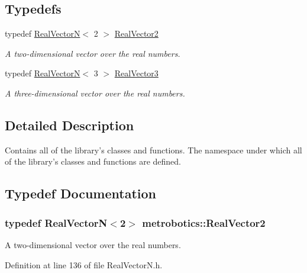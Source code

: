 \subsection*{\-Typedefs}
\begin{DoxyCompactItemize}
\item 
typedef \hyperlink{classmetrobotics_1_1RealVectorN}{\-Real\-Vector\-N}$<$ 2 $>$ \hyperlink{namespacemetrobotics_ad4763dfe0a9a900593afaaa3988068d5}{\-Real\-Vector2}
\begin{DoxyCompactList}\small\item\em \-A two-\/dimensional vector over the real numbers. \end{DoxyCompactList}\item 
typedef \hyperlink{classmetrobotics_1_1RealVectorN}{\-Real\-Vector\-N}$<$ 3 $>$ \hyperlink{namespacemetrobotics_ae3d5d1be736febeba32fbed64b429007}{\-Real\-Vector3}
\begin{DoxyCompactList}\small\item\em \-A three-\/dimensional vector over the real numbers. \end{DoxyCompactList}\end{DoxyCompactItemize}


\subsection{\-Detailed \-Description}
\-Contains all of the library's classes and functions. \-The namespace under which all of the library's classes and functions are defined. 

\subsection{\-Typedef \-Documentation}
\hypertarget{namespacemetrobotics_ad4763dfe0a9a900593afaaa3988068d5}{
\subsubsection[{\-Real\-Vector2}]{\setlength{\rightskip}{0pt plus 5cm}typedef {\bf \-Real\-Vector\-N}$<$2$>$ {\bf metrobotics\-::\-Real\-Vector2}}}\label{namespacemetrobotics_ad4763dfe0a9a900593afaaa3988068d5}


\-A two-\/dimensional vector over the real numbers. 



\-Definition at line 136 of file \-Real\-Vector\-N.\-h.

